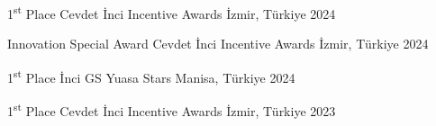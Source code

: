 


\begin{cvhonors}

  \cvhonor
    {1\textsuperscript{st} Place} %
    {Cevdet İnci Incentive Awards} %
    {İzmir, Türkiye} %
    {2024} %

  \cvhonor
    {Innovation Special Award} %
    {Cevdet İnci Incentive Awards} %
    {İzmir, Türkiye} %
    {2024} %

  \cvhonor
    {1\textsuperscript{st} Place} %
    {İnci GS Yuasa Stars} %
    {Manisa, Türkiye} %
    {2024} %

  \cvhonor
    {1\textsuperscript{st} Place} %
    {Cevdet İnci Incentive Awards} %
    {İzmir, Türkiye} %
    {2023} %

\end{cvhonors}
